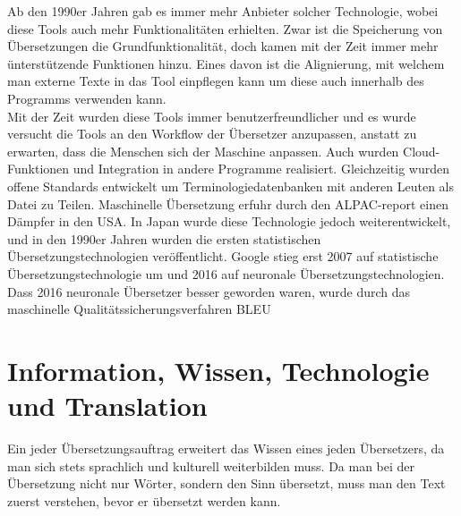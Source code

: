 \documentclass{article}
\begin{document}
	Ab den 1990er Jahren gab es immer mehr Anbieter solcher Technologie, wobei diese Tools auch mehr Funktionalitäten erhielten. Zwar ist die Speicherung von Übersetzungen die Grundfunktionalität, doch kamen mit der Zeit immer mehr ünterstützende Funktionen hinzu. Eines davon ist die Alignierung, mit welchem man externe Texte in das Tool einpflegen kann um diese auch innerhalb des Programms verwenden kann. \\
	Mit der Zeit wurden diese Tools immer benutzerfreundlicher und es wurde versucht die Tools an den Workflow der Übersetzer anzupassen, anstatt zu erwarten, dass die Menschen sich der Maschine anpassen. Auch wurden Cloud-Funktionen und Integration in andere Programme realisiert. Gleichzeitig wurden offene Standards entwickelt um Terminologiedatenbanken mit anderen Leuten als Datei zu Teilen.
	Maschinelle Übersetzung erfuhr durch den ALPAC-report einen Dämpfer in den USA. In Japan wurde diese Technologie jedoch weiterentwickelt, und in den 1990er Jahren wurden die ersten statistischen Übersetzungstechnologien veröffentlicht. Google stieg erst 2007 auf statistische Übersetzungstechnologie um und 2016 auf neuronale Übersetzungstechnologien. Dass 2016 neuronale Übersetzer besser geworden waren, wurde durch das maschinelle Qualitätssicherungsverfahren BLEU

	\section{Information, Wissen, Technologie und Translation}

	Ein jeder Übersetzungsauftrag erweitert das Wissen eines jeden Übersetzers, da man sich stets sprachlich und kulturell weiterbilden muss. Da man bei der Übersetzung nicht nur Wörter, sondern den Sinn übersetzt, muss man den Text zuerst verstehen, bevor er übersetzt werden kann. \\
\end{document}
